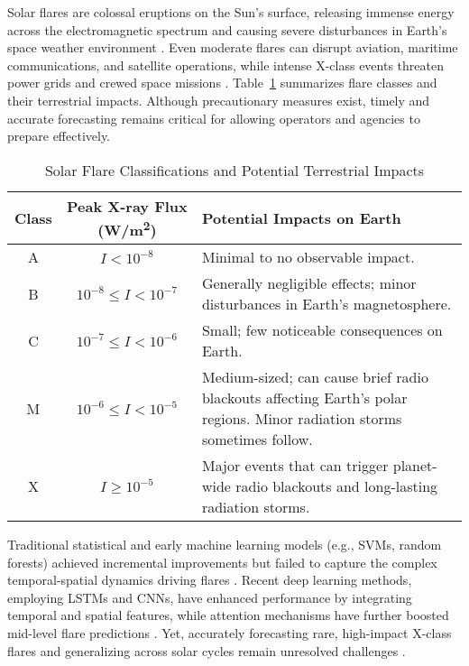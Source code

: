 Solar flares are colossal eruptions on the Sun’s surface, releasing immense energy across the electromagnetic spectrum and causing severe disturbances in Earth’s space weather environment . Even moderate flares can disrupt aviation, maritime communications, and satellite operations, while intense X-class events threaten power grids and crewed space missions . Table~\ref{tab:solar_flare_impacts} summarizes flare classes and their terrestrial impacts. Although precautionary measures exist, timely and accurate forecasting remains critical for allowing operators and agencies to prepare effectively.

\begin{table}[h!]
\centering
\caption{Solar Flare Classifications and Potential Terrestrial Impacts}
\label{tab:solar_flare_impacts}
\begin{tabular}{|c|c|p{8cm}|}
\hline
\textbf{Class} & \textbf{Peak X-ray Flux (W/m\textsuperscript{2})} & \textbf{Potential Impacts on Earth} \\ \hline
A              & $I < 10^{-8}$                                     & Minimal to no observable impact. \\ \hline
B              & $10^{-8} \leq I < 10^{-7}$                        & Generally negligible effects; minor disturbances in Earth's magnetosphere. \\ \hline
C              & $10^{-7} \leq I < 10^{-6}$                        & Small; few noticeable consequences on Earth. \\ \hline
M              & $10^{-6} \leq I < 10^{-5}$                        & Medium-sized; can cause brief radio blackouts affecting Earth's polar regions. Minor radiation storms sometimes follow. \\ \hline
X              & $I \geq 10^{-5}$                                  & Major events that can trigger planet-wide radio blackouts and long-lasting radiation storms. \\ \hline
\end{tabular}
\end{table}

Traditional statistical and early machine learning models (e.g., SVMs, random forests) achieved incremental improvements but failed to capture the complex temporal-spatial dynamics driving flares \citep{RefWorks:RefID:7-schrijver2009driving, RefWorks:RefID:12-zheng2023comparative}. Recent deep learning methods, employing LSTMs and CNNs, have enhanced performance by integrating temporal and spatial features, while attention mechanisms have further boosted mid-level flare predictions \citep{RefWorks:RefID:10-jiao2020solar, RefWorks:RefID:2-abduallah2023operational}. Yet, accurately forecasting rare, high-impact X-class flares and generalizing across solar cycles remain unresolved challenges \citep{RefWorks:RefID:14-hayes2021solar}.

